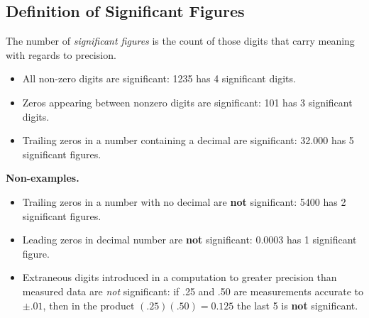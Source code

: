 \subsection{Definition of Significant Figures}
The number of \textit{significant figures} is the count of those digits that carry meaning with regards to precision.
\begin{eg}\leavevmode
\begin{itemize}
  \item All non-zero digits are significant: 1235 has 4 significant digits.
  \item Zeros appearing between nonzero digits are significant: 101 has 3 significant digits.
  \item Trailing zeros in a number containing a decimal are significant: 32.000 has 5 significant figures.
\end{itemize}
\textsf{\textbf{\color{NavyBlue!70!Black}Non-examples.}}
\begin{itemize}
  \item Trailing zeros in a number with no decimal are \textbf{not} significant: 5400 has 2 significant figures.
  \item Leading zeros in decimal number are \textbf{not} significant: 0.0003 has 1 significant figure.
  \item Extraneous digits introduced in a computation to greater precision than measured data are \textit{not} significant: if .25 and .50 are measurements accurate to $\pm.01$, then in the product $(.25)(.50)=0.125$ the last 5 is \textbf{not} significant.
\end{itemize}
\end{eg}
